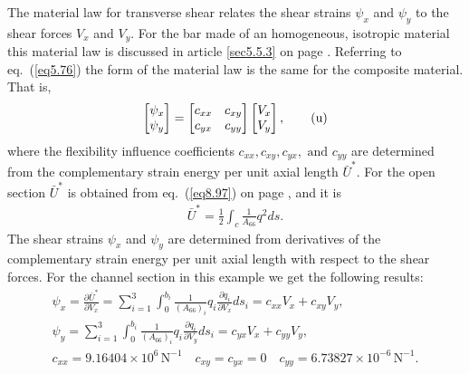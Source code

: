 \documentclass{AeroStructure-ERJohnson}
\begin{document}
\begin{example*}
The material law for transverse shear relates the shear strains
$\psi_{x}$ and $\psi_{y}$ to the shear forces $V_{x}$ and $V_{y}$.
For the bar made of an homogeneous, isotropic material this
material law is discussed in article \ref{sec5.5.3} on page \pageref{sec5.5.3}. Referring
to eq.~(\ref{eq5.76}) the form of the material law is the same for
the composite material. That is,
\begin{align}
\left[\begin{array}{@{}l@{}}\psi_{x}\\
\psi_{y}\end{array}\right]=\left[\begin{array}{@{}cc@{}}c_{x x}
& c_{x y}\\
c_{y x} & c_{y
y}\end{array}\right]\left[\begin{array}{@{}l@{}}V_{x}\\
V_{y}\end{array}\right],\tag{u}\label{ex8.5u}
\end{align}
where the flexibility influence
coefficients $c_{x x}, c_{x y}, c_{y x}, \text { and } c_{y y}$
are determined from the complementary strain energy per unit axial
length $\bar{U}^{*}$. For the open section $\bar{U}^{*}$ is
obtained from eq.~(\ref{eq8.97}) on page \pageref{eq8.97}, and it is
\begin{align}
\bar{U}^{*}=\frac{1}{2} \int_{c} \frac{1}{A_{66}} q^{2} d s.\tag{v}\label{ex8.5v}
\end{align}
The shear strains $\psi_{x}$ and $\psi_{y}$ are determined
from derivatives of the complementary strain energy per unit axial
length with respect to the shear forces. For the channel section
in this example we get the following results:
\begin{gather}
\psi_{x}=\frac{\partial \bar{U}^{*}}{\partial
V_{x}}=\sum_{i=1}^{3}
\int^{b_i}_{0}
\frac{1}{\left(A_{66}\right)_{i}}
q_{i} \frac{\partial q_{i}}{\partial V_{x}} d s_{i}=
c_{xx}V_{x}+c_{x y} V_{y},\nonumber\\
\psi_{y}=\sum_{i=1}^3\int_{0}^{b_i}\frac{1}{(A_{66})_i}q_i\frac{\partial q_i}{\partial
V_{y}}ds_i=c_{yx}V_{x}+c_{yy} V_{y},\nonumber\\
c_{x x}=9.16404 \times 10^{6}\,\mathrm{N}^{-1} \quad c_{x
y}=c_{y x}=0 \quad c_{y y}=6.73827 \times 10^{-6}\,\mathrm{N}^{-1}.\tag{w}\label{ex8.5w}
\end{gather}

\vspace*{-1pc}


\end{example*}
\end{document}
